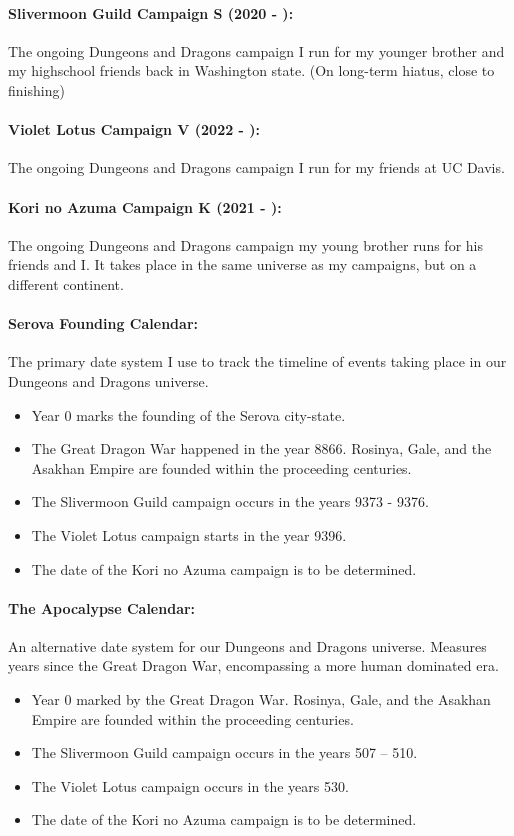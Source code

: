 \documentclass[../main.tex]{subfiles}
\begin{document}
\paragraph{Slivermoon Guild Campaign S (2020 - ):}
The ongoing Dungeons and Dragons campaign I run for my younger brother and my highschool friends back in Washington state. (On long-term hiatus, close to finishing)
\paragraph{Violet Lotus Campaign V (2022 - ):}
The ongoing Dungeons and Dragons campaign I run for my friends at UC Davis.
\paragraph{Kori no Azuma Campaign K (2021 - ):}
The ongoing Dungeons and Dragons campaign my young brother runs for his friends and I. It takes place in the same universe as my campaigns, but on a different continent.
\paragraph{Serova Founding Calendar:}
The primary date system I use to track the timeline of events taking place in our Dungeons and Dragons universe.
\begin{itemize}
    \item Year 0 marks the founding of the Serova city-state.
    \item The Great Dragon War happened in the year 8866. Rosinya, Gale, and the Asakhan Empire are founded within the proceeding centuries.
    \item The Slivermoon Guild campaign occurs in the years 9373 - 9376.
    \item The Violet Lotus campaign starts in the year 9396.
    \item The date of the Kori no Azuma campaign is to be determined.
\end{itemize}
\paragraph{The Apocalypse Calendar:}
An alternative date system for our Dungeons and Dragons universe. Measures years since the Great Dragon War, encompassing a more human dominated era.
\begin{itemize}
    \item Year 0 marked by the Great Dragon War. Rosinya, Gale, and the Asakhan Empire are founded within the proceeding centuries.
    \item The Slivermoon Guild campaign occurs in the years 507 – 510.
    \item The Violet Lotus campaign occurs in the years 530.
    \item The date of the Kori no Azuma campaign is to be determined.
\end{itemize}
\end{document}
